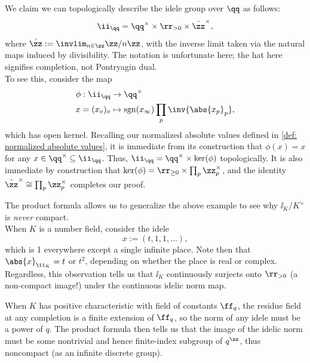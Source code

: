 \documentclass[11pt, x11names, openany]{book}
\begin{document}
\begin{example}[Decomposition of $\ii_\qq$]
\label{example: decomposition of I_Q}
We claim we can topologically describe the idele group over $\qq$ as follows:
\begin{equation*}
    \ii_\qq = \qq^\times \times \rr_{> 0} \times \hat{\zz}^\times,
\end{equation*}
where $\hat{\zz} := \invlim_{n \in \zz} \zz/n\zz$, with the inverse limit taken via the natural maps induced by divisibility. The notation is unfortunate here; the hat here signifies completion, not Pontryagin dual.\\
To see this, consider the map
\begin{align*}
    \phi: \ii_\qq & \to \qq^\times\\
    x = (x_v)_v & \mapsto \sgn(x_\infty) \prod_{p} \inv{\abs{x_p }_p},
\end{align*}
which has open kernel. Recalling our normalized absolute values defined in \ref{def: normalized absolute values}, it is immediate from its construction that $\phi(x) = x$ for any $x \in \qq^\times \subseteq \ii_\qq$. Thus, $\ii_\qq = \qq^\times \times \ker(\phi)$ topologically. It is also immediate by construction that $\ker(\phi) = \rr_{\geq 0} \times \prod_p \zz_p^\times$, and the identity $\hat{\zz}^\times \cong \prod_p \zz_p^\times$ completes our proof.
\end{example}


\begin{observation}
    The product formula allows us to generalize the above example to see why $\ii_K/K^\times$ is \textit{never} compact. \\
    When $K$ is a number field, consider the idele 
    \begin{equation*}
        x := (t, 1, 1, \ldots ),
    \end{equation*}
    which is 1 everywhere except a single infinite place. Note then that $\abs{x}_{\ii_K} = t$ or $t^2$, depending on whether the place is real or complex. Regardless, this observation tells us that $\ii_K$ continuously surjects onto $\rr_{> 0}$ (a non-compact image!) under the continuous idelic norm map.

    When $K$ has positive characteristic with field of constants $\ff_q$, the residue field at any completion is a finite extension of $\ff_q$, so the norm of any idele must be a power of $q$. The product formula then tells us that the image of the idelic norm must be some nontrivial and hence finite-index subgroup of $q^\zz$, thus noncompact (as an infinite discrete group).
\end{observation}
\end{document}
